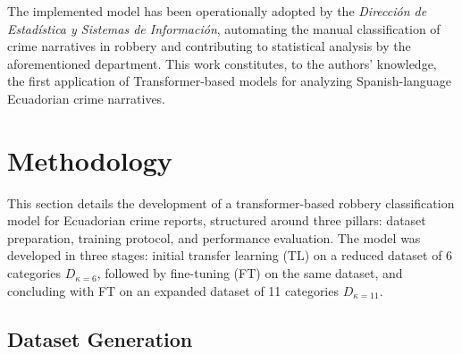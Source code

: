 \documentclass[runningheads]{llncs}
\begin{document}
The implemented model has been operationally adopted by the
\textit{Dirección de Estadística y Sistemas de Información},
automating the manual classification of crime narratives in robbery
and contributing to statistical analysis by the aforementioned
department. This work constitutes, to the authors' knowledge, the
first application of Transformer-based models for analyzing
Spanish-language Ecuadorian crime narratives.



\section{Methodology}
\label{sec:methods}
This section details the development of a transformer-based robbery
classification model for Ecuadorian crime reports, structured around
three pillars: dataset preparation, training protocol, and performance
evaluation. The model was developed in three stages: initial transfer
learning (TL) on a reduced dataset of 6 categories \(D_{\kappa=6}\),
followed by fine-tuning (FT) on the same dataset, and concluding with
FT on an expanded dataset of 11 categories \(D_{\kappa=11}\). 

\subsection{Dataset Generation}
\label{sec:dataset-generation}
\end{document}
